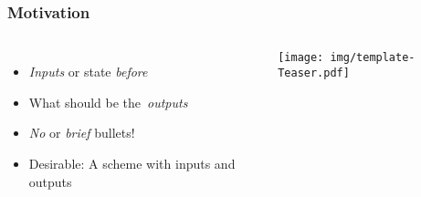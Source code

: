 




\begin{frame}
  \frametitle{Motivation}
  \begin{columns}
    \begin{itemize}
        \item \emph{Inputs} or state \emph{before}
        \item What should be the~\emph{outputs}
        \item \emph{No} or \emph{brief} bullets!
        \item Desirable: A scheme with inputs and outputs
    \end{itemize}
     
    \texttt{[image: img/template-Teaser.pdf]}
  \end{columns}
\end{frame}



